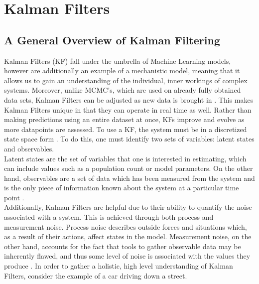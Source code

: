 \section{Kalman Filters} \label{KF_SECT}
\subsection{A General Overview of Kalman Filtering}
Kalman Filters (KF) fall under the umbrella of Machine Learning models, however are additionally an example of a mechanistic model, meaning that it allows us to gain an understanding of the individual, inner workings of complex systems. Moreover, unlike MCMC's, which are used on already fully obtained data sets, Kalman Filters can be adjusted as new data is brought in \cite{ChowFerrer}. This makes Kalman Filters unique in that they can operate in real time as well. Rather than making predictions using an entire dataset at once, KFs improve and evolve as more datapoints are assessed. To use a KF, the system must be in a discretized state space form \cite{SimonHaykinText}. To do this, one must identify two sets of variables: latent states and observables.\\

Latent states are the set of variables that one is interested in estimating, which can include values such as a population count or model parameters. On the other hand, observables are a set of data which has been measured from the system and is the only piece of information known about the system at a particular time point \cite{ChowFerrer}. \\

Additionally, Kalman Filters are helpful due to their ability to quantify the noise associated with a system. This is achieved through both process and measurement noise. Process noise describes outside forces and situations which, as a result of their actions, affect states in the model. Measurement noise, on the other hand, accounts for the fact that tools to gather observable data may be inherently flawed, and thus some level of noise is associated with the values they produce \cite{ChowFerrer}. In order to gather a holistic, high level understanding of Kalman Filters, consider the example of a car driving down a street.\\

